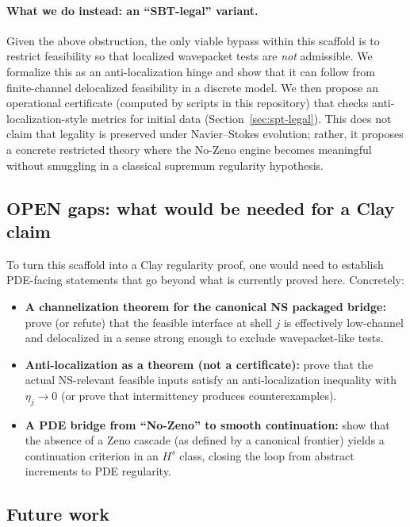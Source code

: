 \documentclass[11pt]{article}
\begin{document}
\paragraph{What we do instead: an ``SBT-legal'' variant.}
Given the above obstruction, the only viable bypass within this scaffold is to restrict feasibility
so that localized wavepacket tests are \emph{not} admissible. We formalize this as an anti-localization
hinge and show that it can follow from finite-channel delocalized feasibility in a discrete model.
We then propose an operational certificate (computed by scripts in this repository) that checks
anti-localization-style metrics for initial data (Section~\ref{sec:spt-legal}).
This does not claim that legality is preserved under Navier--Stokes evolution; rather, it proposes
a concrete restricted theory where the No-Zeno engine becomes meaningful without smuggling in a
classical supremum regularity hypothesis.

\subsection{OPEN gaps: what would be needed for a Clay claim}
To turn this scaffold into a Clay regularity proof, one would need to establish PDE-facing statements
that go beyond what is currently proved here. Concretely:
\begin{itemize}
\item \textbf{A channelization theorem for the canonical NS packaged bridge:}
prove (or refute) that the feasible interface at shell $j$ is effectively low-channel and delocalized
in a sense strong enough to exclude wavepacket-like tests.
\item \textbf{Anti-localization as a theorem (not a certificate):}
prove that the actual NS-relevant feasible inputs satisfy an anti-localization inequality with
$\eta_j\to 0$ (or prove that intermittency produces counterexamples).
\item \textbf{A PDE bridge from ``No-Zeno'' to smooth continuation:}
show that the absence of a Zeno cascade (as defined by a canonical frontier) yields a continuation
criterion in an $H^s$ class, closing the loop from abstract increments to PDE regularity.
\end{itemize}

\subsection{Future work}
\end{document}
